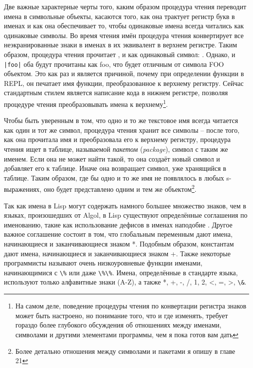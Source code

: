 Две важные характерные черты того, каким образом процедура чтения переводит имена в
символьные объекты, касаются того, как она трактует регистр букв в именах и как она
обеспечивает то, чтобы одинаковые имена всегда читались как одинаковые символы. Во время
чтения имён процедура чтения конвертирует все неэкранированные знаки в именах в их
эквивалент в верхнем регистре. Таким образом, процедура чтения прочитает ,
 и  как одинаковый символ: . Однако, \code{\f\o\o} и
\lstinline!|foo|! оба будут прочитаны как foo, что будет отличным от символа FOO
объектом. Это как раз и является причиной, почему при определении функции в REPL, он
печатает имя функции, преобразованное к верхнему регистру. Сейчас стандартным стилем
является написание кода в нижнем регистре, позволяя процедуре чтения преобразовывать имена
к верхнему\footnote{На самом деле, поведение процедуры чтения по конвертации регистра
  знаков может быть настроено, но понимание того, что и где изменять, требует гораздо
  более глубокого обсуждения об отношениях между именами, символами и другими элементами
  программы, чем я пока готов вам дать}.

Чтобы быть уверенным в том, что одно и то же текстовое имя всегда читается как один и тот
же символ, процедура чтения хранит все символы -- после того, как она прочитала имя и
преобразовала его к верхнему регистру, процедура чтения ищет в таблице, называемой
\textit{пакетом} (\textit{package}), символ с таким же именем. Если она не может найти
такой, то она создаёт новый символ и добавляет его к таблице. Иначе она возвращает символ,
уже хранящийся в таблице. Таким образом, где бы одно и то же имя не появлялось в любых
s-выражениях, оно будет представлено одним и тем же объектом\footnote{Более детально
  отношения между символами и пакетами я опишу в главе 21}.

Так как имена в Lisp могут содержать намного большее множество знаков, чем в языках,
произошедших от Algol, в Lisp существуют определённые соглашения по именованию, такие как
использование дефисов в именах наподобие . Другое важное соглашение
состоит в том, что глобальным переменным дают имена, начинающиеся и заканчивающиеся знаком
*. Подобным образом, константам дают имена, начинающиеся и заканчивающиеся знаком +. Также
некоторые программисты называют очень низкоуровневые функции именами, начинающимися с
\lstinline!\%! или даже \lstinline!\%\%!. Имена, определённые в стандарте языка,
используют только алфавитные знаки (A-Z), а также *, +, -, /, 1, 2, <, =, >, \lstinline!\&!.


